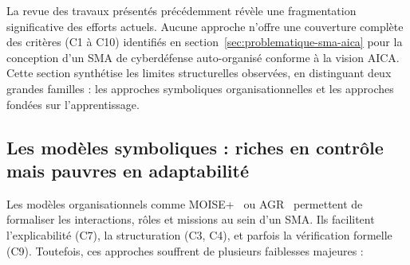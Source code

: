 \documentclass[ twoside,openright,titlepage,numbers=noenddot,headinclude,%
                footinclude=true,cleardoublepage=empty,abstractoff, %
                BCOR=5mm,paper=a4,fontsize=11pt,%
                french,american,%
                ]{scrreprt}
\begin{document}

La revue des travaux présentés précédemment révèle une fragmentation significative des efforts actuels. Aucune approche n'offre une couverture complète des critères (C1 à C10) identifiés en section~\ref{sec:problematique-sma-aica} pour la conception d'un SMA de cyberdéfense auto-organisé conforme à la vision AICA. Cette section synthétise les limites structurelles observées, en distinguant deux grandes familles : les approches symboliques organisationnelles et les approches fondées sur l'apprentissage.

\subsection{Les modèles symboliques : riches en contrôle mais pauvres en adaptabilité}

Les modèles organisationnels comme MOISE+~\cite{Hubner2002} ou AGR~\cite{Ferber2003} permettent de formaliser les interactions, rôles et missions au sein d'un SMA. Ils facilitent l'explicabilité (C7), la structuration (C3, C4), et parfois la vérification formelle (C9). Toutefois, ces approches souffrent de plusieurs faiblesses majeures :
\end{document}

